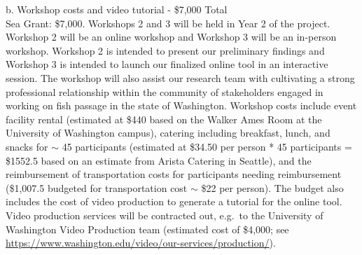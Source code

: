 \documentclass[12pt]{elsarticle}
\begin{document}
b. Workshop costs and video tutorial - \$7,000  Total\\
Sea Grant: \$7,000. Workshops 2 and 3 will be held in Year 2 of the project.  Workshop 2 will be an online workshop and Workshop 3 will be an in-person workshop. Workshop 2 is intended to present our preliminary findings and Workshop 3 is intended to launch our finalized online tool in an interactive session. The workshop will also assist our research team with cultivating a strong professional relationship within the community of stakeholders engaged in working on fish passage in the state of Washington. Workshop costs include event facility rental (estimated at \$440 based on the Walker Ames Room at the University of Washington campus), catering including breakfast, lunch, and snacks for $\sim$ 45 participants (estimated at \$34.50 per person * 45 participants = \$1552.5 based on an estimate from Arista Catering in Seattle), and the reimbursement of transportation costs for participants needing reimbursement (\$1,007.5 budgeted for transportation cost $\sim$ \$22 per person). The budget also includes the cost of video production to generate a tutorial for the online tool. Video production services will be contracted out, e.g.\ to the University of Washington Video Production team (estimated cost of \$4,000; see \url{https://www.washington.edu/video/our-services/production/}).  \\
\end{document}
